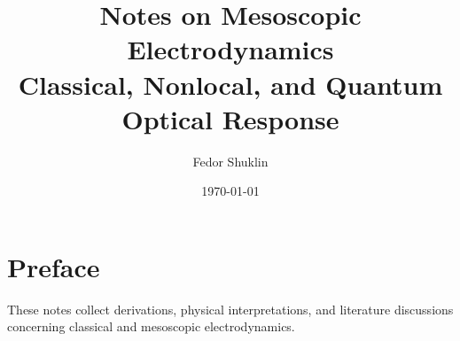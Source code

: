 \documentclass[
    11pt,
    a4paper,
    oneside,
    openany
]{book}
\title{
    \Huge Notes on Mesoscopic Electrodynamics\\[1em]
    \Large Classical, Nonlocal, and Quantum Optical Response
}
\author{Fedor Shuklin}
\date{\today}
\numberwithin{equation}{chapter}
\theoremstyle{definition}
\theoremstyle{plain}
\theoremstyle{remark}
\begin{document}

\frontmatter

\maketitle

\chapter*{Preface}

These notes collect derivations, physical interpretations, and literature
discussions concerning classical and mesoscopic electrodynamics.

\tableofcontents



\mainmatter







\appendix




\backmatter

\printbibliography[
    heading=bibintoc,
    title={Bibliography}
]
\end{document}
